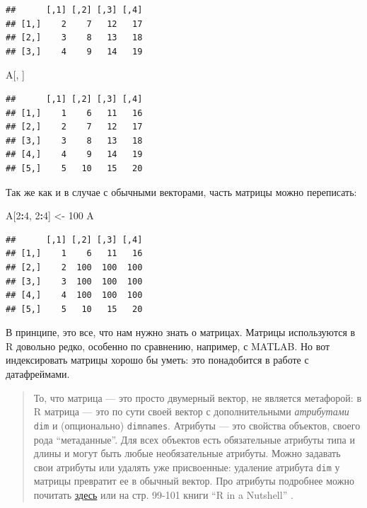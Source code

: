 \documentclass[]{book}
\newenvironment{Shaded}{\begin{snugshade}}{\end{snugshade}}
\newcommand{\DecValTok}[1]{\textcolor[rgb]{0.00,0.00,0.81}{#1}}
\newcommand{\StringTok}[1]{\textcolor[rgb]{0.31,0.60,0.02}{#1}}
\newcommand{\OperatorTok}[1]{\textcolor[rgb]{0.81,0.36,0.00}{\textbf{#1}}}
\newcommand{\NormalTok}[1]{#1}
\begin{document}
\begin{verbatim}
##      [,1] [,2] [,3] [,4]
## [1,]    2    7   12   17
## [2,]    3    8   13   18
## [3,]    4    9   14   19
\end{verbatim}

\begin{Shaded}
\begin{Highlighting}[]
\NormalTok{A[, ]}
\end{Highlighting}
\end{Shaded}

\begin{verbatim}
##      [,1] [,2] [,3] [,4]
## [1,]    1    6   11   16
## [2,]    2    7   12   17
## [3,]    3    8   13   18
## [4,]    4    9   14   19
## [5,]    5   10   15   20
\end{verbatim}

Так же как и в случае с обычными векторами, часть матрицы можно
переписать:

\begin{Shaded}
\begin{Highlighting}[]
\NormalTok{A[}\DecValTok{2}\OperatorTok{:}\DecValTok{4}\NormalTok{, }\DecValTok{2}\OperatorTok{:}\DecValTok{4}\NormalTok{] <-}\StringTok{ }\DecValTok{100}
\NormalTok{A}
\end{Highlighting}
\end{Shaded}

\begin{verbatim}
##      [,1] [,2] [,3] [,4]
## [1,]    1    6   11   16
## [2,]    2  100  100  100
## [3,]    3  100  100  100
## [4,]    4  100  100  100
## [5,]    5   10   15   20
\end{verbatim}

В принципе, это все, что нам нужно знать о матрицах. Матрицы
используются в R довольно редко, особенно по сравнению, например, с
MATLAB. Но вот индексировать матрицы хорошо бы уметь: это понадобится в
работе с датафреймами.

\begin{quote}
То, что матрица --- это просто двумерный вектор, не является метафорой:
в R матрица --- это по сути своей вектор с дополнительными
\emph{атрибутами} \texttt{dim} и (опционально) \texttt{dimnames}.
Атрибуты --- это свойства объектов, своего рода ``метаданные''. Для всех
объектов есть обязательные атрибуты типа и длины и могут быть любые
необязательные атрибуты. Можно задавать свои атрибуты или удалять уже
присвоенные: удаление атрибута \texttt{dim} у матрицы превратит ее в
обычный вектор. Про атрибуты подробнее можно почитать
\href{https://perso.esiee.fr/~courivad/R/06-objects.html}{здесь} или на
стр. 99-101 книги ``R in a Nutshell'' \citep{adler2010r}.
\end{quote}
\end{document}
